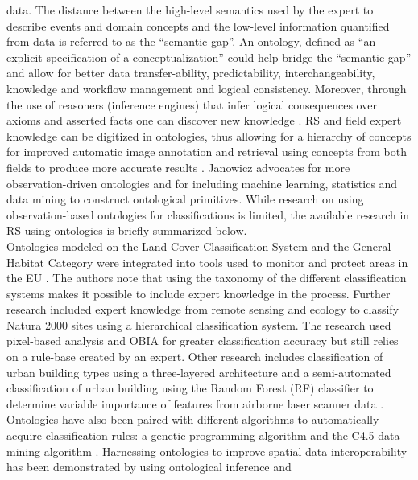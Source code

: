 \documentclass[authoryear, review,12pt,number]{elsarticle}
\begin{document}
data. The distance between the high-level semantics used by the expert to 
describe events and domain concepts and the low-level information quantified 
from data is referred to as the ``semantic gap''. An ontology, defined as ``an 
explicit specification of a conceptualization'' \citep{gruber1993} could help 
bridge the ``semantic gap'' and allow for better data transfer-ability, 
predictability, interchangeability, knowledge and workflow management and 
logical consistency. 
Moreover, through the use of reasoners (inference engines) 
that infer logical consequences over axioms and asserted facts one can discover 
new knowledge \citep{Arvor2013, Andres2013a}. RS and field expert knowledge can 
be digitized in ontologies, thus allowing for a hierarchy of concepts for 
improved automatic image annotation and retrieval using concepts from both 
fields to produce more accurate results 
\cite{Srikanth:2005:EOA:1076034.1076128}. Janowicz \cite{Janowicz2012} advocates 
for more observation-driven ontologies and for including machine learning, 
statistics and data mining to construct ontological primitives. While research 
on using observation-based ontologies for classifications is limited, the 
available research in RS using ontologies is briefly summarized below. \\
Ontologies modeled on the Land Cover Classification
System and the General Habitat Category were integrated into tools used to 
monitor and protect areas in the EU \citep{Arvor2013}. The authors note 
that using the taxonomy of the different classification systems
makes it possible to include expert knowledge in the process. 
Further research included expert knowledge from remote sensing and ecology to 
classify Natura 2000 sites using a hierarchical classification system. The 
research used pixel-based analysis and OBIA for greater classification accuracy 
but still relies on a rule-base created by an expert\citep{Lucas2015}.  Other 
research includes classification of urban building types using a three-layered 
architecture \citep{diSciascio2013} and a semi-automated classification of 
urban building using the Random Forest (RF) classifier to determine variable 
importance of features from airborne laser scanner data \citep{Belgiu2014}. 
Ontologies have also been paired with different algorithms to automatically 
acquire classification rules: a genetic programming algorithm 
\citep{Forestier2012470} and the C4.5 data mining algorithm 
\citep{Sheeren2006ML}.
Harnessing ontologies to improve spatial data interoperability has been 
demonstrated by using ontological inference and
\end{document}
